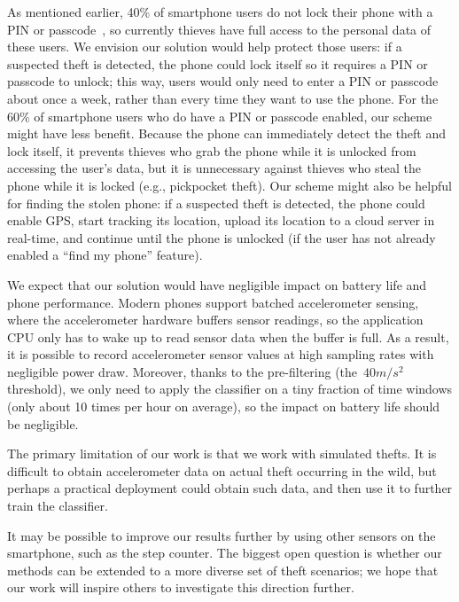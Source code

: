 As mentioned earlier, 40\% of smartphone users do not lock their phone with a PIN or passcode~\cite{egelman:lock,Harbach2016b}, so currently thieves have full access to the personal data of these users.
We envision our solution would help protect those users: if a suspected theft is detected, the phone could lock itself so it requires a PIN or passcode to unlock; this way, users would only need to enter a PIN or passcode about once a week, rather than every time they want to use the phone.
For the 60\% of smartphone users who do have a PIN or passcode enabled, our scheme might have less benefit.
Because the phone can immediately detect the theft and lock itself, it prevents thieves who grab the phone while it is unlocked from accessing the user's data, but it is unnecessary against thieves who steal the phone while it is locked (e.g., pickpocket theft).
Our scheme might also be helpful for finding the stolen phone: if a suspected theft is detected, the phone could enable GPS, start tracking its location, upload its location to a cloud server in real-time, and continue until the phone is unlocked (if the user has not already enabled a ``find my phone'' feature).

We expect that our solution would have negligible impact on battery life and phone performance.
Modern phones support batched accelerometer sensing, where the accelerometer hardware buffers sensor readings, so the application CPU only has to wake up to read sensor data when the buffer is full.
As a result, it is possible to record accelerometer sensor values at high sampling rates with negligible power draw.
Moreover, thanks to the pre-filtering (the~$40 m/s^2$ threshold),
we only need to apply the classifier on a tiny fraction of time windows (only about 10 times per hour on average),
so the impact on battery life should be negligible.

The primary limitation of our work is that we work with simulated thefts.
It is difficult to obtain accelerometer data on actual theft occurring in the wild, but perhaps a practical deployment could obtain such data, and then use it to further train the classifier.

It may be possible to improve our results further by using other sensors on the smartphone, such as the step counter.
The biggest open question is whether our methods can be extended to a more diverse set of theft scenarios; we hope that our work will inspire others to investigate this direction further.



